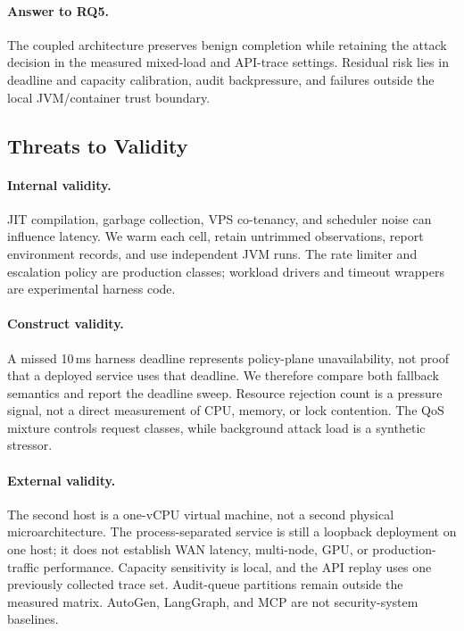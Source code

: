 \paragraph{Answer to RQ5.}
The coupled architecture preserves benign completion while retaining the
attack decision in the measured mixed-load and API-trace settings. Residual
risk lies in deadline and capacity calibration, audit backpressure, and
failures outside the local JVM/container trust boundary.

\subsection{Threats to Validity}

\paragraph{Internal validity.}
JIT compilation, garbage collection, VPS co-tenancy, and scheduler noise can
influence latency. We warm each cell, retain untrimmed observations, report
environment records, and use independent JVM runs. The rate limiter and
escalation policy are production classes; workload drivers and timeout
wrappers are experimental harness code.

\paragraph{Construct validity.}
A missed 10\,ms harness deadline represents policy-plane unavailability, not
proof that a deployed service uses that deadline. We therefore compare both
fallback semantics and report the deadline sweep. Resource rejection count is
a pressure signal, not a direct measurement of CPU, memory, or lock
contention. The QoS mixture controls request classes, while background attack
load is a synthetic stressor.

\paragraph{External validity.}
The second host is a one-vCPU virtual machine, not a second physical
microarchitecture. The process-separated service is still a loopback
deployment on one host; it does not establish WAN latency, multi-node, GPU, or
production-traffic performance. Capacity sensitivity is local, and the API
replay uses one previously collected trace set. Audit-queue partitions remain
outside the measured matrix. AutoGen, LangGraph, and MCP are not
security-system baselines.
